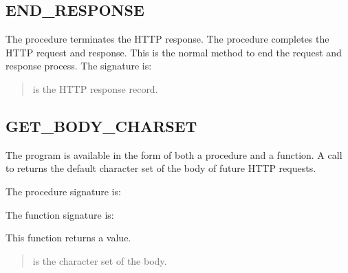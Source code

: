 \documentclass[letterpaper,10pt,english,openany,oneside]{sphinxmanual}
\begin{document}
\subsection{END\_RESPONSE}
\label{\detokenize{utl_http:end-response}}
The  procedure terminates the HTTP response. The
 procedure completes the HTTP request and response. This is
the normal method to end the request and response process. The signature
is:
\begin{quote}

\end{quote}


\begin{quote}

 is the HTTP response record.
\end{quote}


\subsection{GET\_BODY\_CHARSET}
\label{\detokenize{utl_http:get-body-charset}}
The  program is available in the form of both a
procedure and a function. A call to  returns the
default character set of the body of future HTTP requests.

The procedure signature is:
\begin{quote}

\end{quote}

\newpage

The function signature is:
\begin{quote}

\end{quote}

This function returns a  value.


\begin{quote}

 is the character set of the body.
\end{quote}
\end{document}
